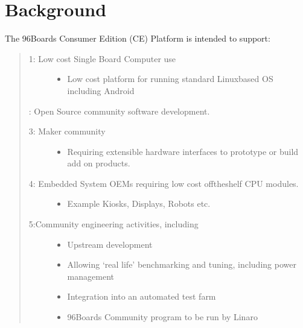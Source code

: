 \documentclass[a4paper,10pt,oneside,english]{sphinxmanual}
\begin{document}
\chapter{Background}
\label{\detokenize{chapter1-ce:background}}
\sphinxAtStartPar
The 96Boards Consumer Edition (CE) Platform is intended to support:
\begin{quote}
\begin{description}
\item[{1: Low cost Single Board Computer use}] \leavevmode\begin{itemize}
\item {} 
\sphinxAtStartPar
Low cost platform for running standard Linux\sphinxhyphen{}based OS including Android

\end{itemize}

\end{description}

: Open Source community software development.
\begin{description}
\item[{3: Maker community}] \leavevmode\begin{itemize}
\item {} 
\sphinxAtStartPar
Requiring extensible hardware interfaces to prototype or build add on products.

\end{itemize}

\item[{4: Embedded System OEMs requiring low cost off\sphinxhyphen{}the\sphinxhyphen{}shelf CPU modules.}] \leavevmode\begin{itemize}
\item {} 
\sphinxAtStartPar
Example \sphinxhyphen{} Kiosks, Displays, Robots etc.

\end{itemize}

\item[{5:Community engineering activities, including}] \leavevmode\begin{itemize}
\item {} 
\sphinxAtStartPar
Upstream development

\item {} 
\sphinxAtStartPar
Allowing ‘real life’ benchmarking and tuning, including power management

\item {} 
\sphinxAtStartPar
Integration into an automated test farm

\item {} 
\sphinxAtStartPar
96Boards Community program to be run by Linaro

\end{itemize}

\end{description}
\end{quote}
\end{document}
